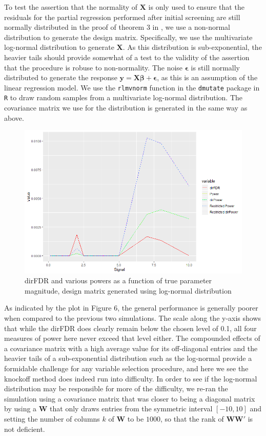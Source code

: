 \documentclass[]{scrartcl}
\newcommand{\1}[1]{\mathbbm{1}_{\left\{#1\right\}}}
\begin{document}
To test the assertion that the normality of $\mathbf{X}$ is only used  to ensure that the residuals for the partial regression performed after initial screening are still normally distributed in the proof of theorem 3 in \cite{kohd}, we use a non-normal distribution to generate the design matrix. Specifically, we use the multivariate log-normal distribution to generate $\mathbf{X}$. As this distribution is sub-exponential, the heavier tails should provide somewhat of a test to the validity of the assertion that the procedure is robuse to non-normality. The noise $\pmb{\epsilon}$ is still normally distributed to generate the response $\mathbf{y} = \mathbf{X}\pmb{\beta} + \pmb{\epsilon}$, as this is an assumption of the linear regression model. We use the \texttt{rlmvnorm} function in the \texttt{dmutate} package in \texttt{R} to draw random samples from a multivariate log-normal distribution. The covariance matrix we use for the distribution is generated in the same way as above.
\begin{figure}[h!]
	\centering
	\includegraphics[width=\textwidth]{results_lgnrm1}
	\caption{dirFDR and various powers as a function of true parameter magnitude, design matrix generated using log-normal distribution}
\end{figure}
 As indicated by the plot in Figure 6, the general performance is generally poorer when compared to the previous two simulations. The scale along the y-axis shows that while the dirFDR does clearly remain below the chosen level of 0.1, all four measures of power here never exceed that level either. The compounded effects of a covariance matrix with a high average value for its off-diagonal entries and the heavier tails of a sub-exponential distribution such as the log-normal provide a formidable challenge for any variable selection procedure, and here we see the knockoff method does indeed run into difficulty. In order to see if the log-normal distribution may be responsible for more of the difficulty, we re-ran the simulation using a covariance matrix that was closer to being a diagonal matrix by using a $\mathbf{W}$ that only draws entries from the symmetric interval $[-10, 10]$ and setting the number of columns $k$ of $\mathbf{W}$ to be $1000$, so that the rank of $\mathbf{W} \mathbf{W}'$ is not deficient. 
 
\end{document}
